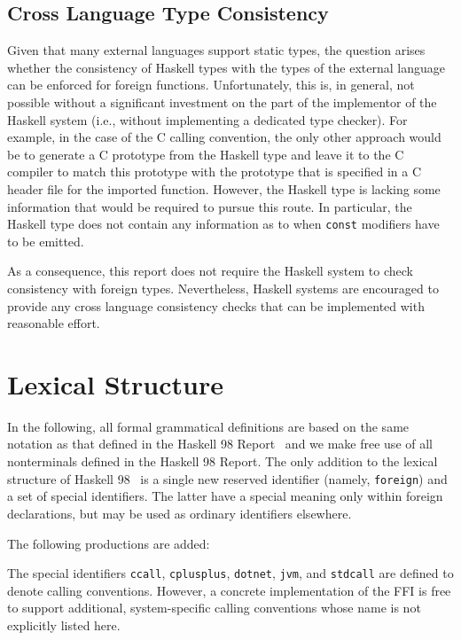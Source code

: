 \documentclass[a4paper,twoside]{article}
\newcommand{\code}[1]{\texttt{#1}}      %
\begin{document}
\subsection{Cross Language Type Consistency}

Given that many external languages support static types, the question arises
whether the consistency of Haskell types with the types of the external
language can be enforced for foreign functions.  Unfortunately, this is, in
general, not possible without a significant investment on the part of the
implementor of the Haskell system (i.e., without implementing a dedicated type
checker).  For example, in the case of the C calling convention, the only
other approach would be to generate a C prototype from the Haskell type and
leave it to the C compiler to match this prototype with the prototype that is
specified in a C header file for the imported function.  However, the Haskell
type is lacking some information that would be required to pursue this route.
In particular, the Haskell type does not contain any information as to when
\code{const} modifiers have to be emitted.  

As a consequence, this report does not require the Haskell system to check
consistency with foreign types.  Nevertheless, Haskell systems are encouraged
to provide any cross language consistency checks that can be implemented with
reasonable effort.


\newpage
\section{Lexical Structure}

In the following, all formal grammatical definitions are based on the same
notation as that defined in the Haskell 98
Report~\cite[Section~2.1]{haskell98} and we make free use of all nonterminals
defined in the Haskell 98 Report.  The only addition to the lexical structure
of Haskell 98~\cite[Section~2]{haskell98} is a single new reserved identifier
(namely, \code{foreign}) and a set of special identifiers.  The latter have a
special meaning only within foreign declarations, but may be used as ordinary
identifiers elsewhere.

The following productions are added:
%
\begin{grammar}
\end{grammar}
%
The special identifiers \code{ccall}, \code{cplusplus}, \code{dotnet},
\code{jvm}, and \code{stdcall} are defined to denote calling conventions.
However, a concrete implementation of the FFI is free to support additional,
system-specific calling conventions whose name is not explicitly listed here.
\end{document}
